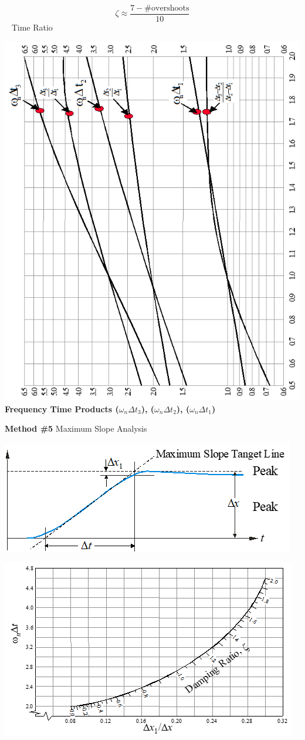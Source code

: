 \documentclass[
]{book}
\begin{document}
\[
\zeta \approx \frac{7 - \mathrm{\# overshoots}}{10}
\]
~
Time Ratio

\includegraphics{media/08/image78.png}
\textbf{Frequency Time Products (\(\omega_n \Delta t_3\)), (\(\omega_n \Delta t_2\)), (\(\omega_n \Delta t_1\))}

\textbf{Method \#5} Maximum Slope Analysis

\includegraphics{media/08/image79.png}

\includegraphics{media/08/image80.png}
\end{document}
